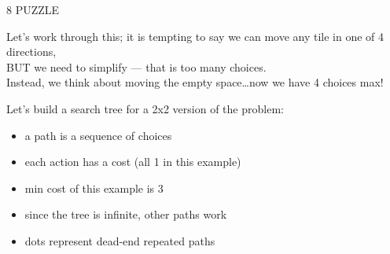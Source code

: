 \documentclass[../../lecture_notes.tex]{subfiles}
\begin{document}
8 PUZZLE\\

\begin{center}  \end{center}

\noindent Let’s work through this; it is tempting to say we can move any tile in one of 4 directions, \\
\indent BUT we need to simplify — that is too many choices.\\
Instead, we think about moving the empty space…now we have 4 choices max!

\noindent Let’s build a search tree for a 2x2 version of the problem:
\begin{itemize}[itemsep=0mm]
\item a path is a sequence of choices
\item each action has a cost (all 1 in this example)
\item min cost of this example is 3
\item since the tree is infinite, other paths work
\item dots represent dead-end repeated paths
\end{itemize} \medskip
\end{document}
